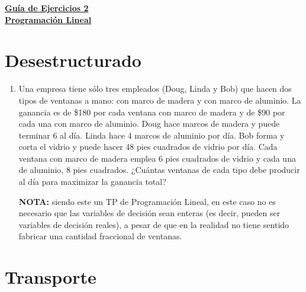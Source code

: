 \documentclass{article}
\begin{document}
\begin{center}
    \underline{\textbf{\large Guía de Ejercicios 2}} \\[5pt]
    \underline{\textbf{\large Programación Lineal}}
\end{center}

\section*{Desestructurado}

\begin{enumerate}
    \item Una empresa tiene sólo tres empleados (Doug, Linda y Bob) que hacen dos tipos de ventanas a mano: con marco de madera y con marco de aluminio. La ganancia es de \$180 por cada ventana con marco de madera y de \$90 por cada una con marco de aluminio. Doug hace marcos de madera y puede terminar 6 al día. Linda hace 4 marcos de aluminio por día. Bob forma y corta el vidrio y puede hacer 48 pies cuadrados de vidrio por día. Cada ventana con marco de madera emplea 6 pies cuadrados de vidrio y cada una de aluminio, 8 pies cuadrados.  
    ¿Cuántas ventanas de cada tipo debe producir al día para maximizar la ganancia total?  

    \textbf{NOTA:} siendo este un TP de Programación Lineal, en este caso no es necesario que las variables de decisión sean enteras (es decir, pueden ser variables de decisión reales), a pesar de que en la realidad no tiene sentido fabricar una cantidad fraccional de ventanas.
\end{enumerate}

\section*{Transporte}
\end{document}
